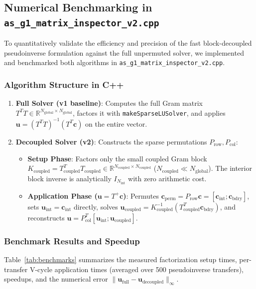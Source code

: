 \documentclass[11pt,a4paper]{article}
\newcommand{\R}{\mathbb{R}}
\begin{document}
\subsection{Numerical Benchmarking in \texttt{as\_g1\_matrix\_inspector\_v2.cpp}}
To quantitatively validate the efficiency and precision of the fast block-decoupled pseudoinverse formulation against the full unpermuted solver, we implemented and benchmarked both algorithms in \texttt{as\_g1\_matrix\_inspector\_v2.cpp}.

\subsubsection{Algorithm Structure in C++}
\begin{enumerate}
    \item \textbf{Full Solver (v1 baseline)}: Computes the full Gram matrix $T^T T \in \R^{N_{\text{global}} \times N_{\text{global}}}$, factors it with \texttt{makeSparseLUSolver}, and applies $\mathbf{u} = (T^T T)^{-1} (T^T \mathbf{c})$ on the entire vector.
    \item \textbf{Decoupled Solver (v2)}: Constructs the sparse permutations $P_{\text{row}}, P_{\text{col}}$:
    \begin{itemize}
        \item \textbf{Setup Phase}: Factors only the small coupled Gram block $K_{\text{coupled}} = T_{\text{coupled}}^T T_{\text{coupled}} \in \R^{N_{\text{coupled}} \times N_{\text{coupled}}}$ ($N_{\text{coupled}} \ll N_{\text{global}}$). The interior block inverse is analytically $I_{N_{\text{int}}}$ with zero arithmetic cost.
        \item \textbf{Application Phase ($\mathbf{u} = T^+ \mathbf{c}$)}: Permutes $\mathbf{c}_{\text{perm}} = P_{\text{row}} \mathbf{c} = [\mathbf{c}_{\text{int}}; \mathbf{c}_{\text{bdry}}]$, sets $\mathbf{u}_{\text{int}} = \mathbf{c}_{\text{int}}$ directly, solves $\mathbf{u}_{\text{coupled}} = K_{\text{coupled}}^{-1} (T_{\text{coupled}}^T \mathbf{c}_{\text{bdry}})$, and reconstructs $\mathbf{u} = P_{\text{col}}^T [\mathbf{u}_{\text{int}}; \mathbf{u}_{\text{coupled}}]$.
    \end{itemize}
\end{enumerate}

\subsubsection{Benchmark Results and Speedup}
Table~\ref{tab:benchmarks} summarizes the measured factorization setup times, per-transfer V-cycle application times (averaged over 500 pseudoinverse transfers), speedups, and the numerical error $\|\mathbf{u}_{\text{full}} - \mathbf{u}_{\text{decoupled}}\|_\infty$.
\end{document}
